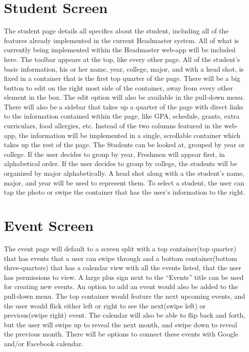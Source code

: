 \documentclass[12pt onesided letterpaper]{article}
\begin{document}
\section*{Student Screen}
The student page details all specifics about the student, including all of the features already implemented in the current Headmaster system.  All of what is currently being implemented within the Headmaster web-app will be included here.   The toolbar appears at the top, like every other page.  All of the student's basic information, his or her name, year, college, major, and with a head shot, is fixed in a container that is the first top quarter of the page.  There will be a big button to edit on the right most side of the container, away from every other element in the box.  The edit option will also be available in the pull-down menu.  There will also be a sidebar that takes up a quarter of the page with direct links to the information contained within the page, like GPA, schedule, grants, extra curriculars, food allergies, etc. Instead of the two columns featured in the web-app, the information will be implemented in a single, scrollable container which takes up the rest of the page.  
The Students can be looked at, grouped by year or college.  If the user decides to group by year, Freshmen will appear first, in alphabetical order.  If the user decides to group by college, the students will be organized by major alphabetically.  A head shot along with a the student's name, major, and year will be used to represent them. To select a student, the user can tap the photo or swipe the container that has the user's information to the right. 

\section*{Event Screen}
The event page will default to a screen split with a top container(top quarter) that has events that a user can swipe through and a bottom container(bottom three-quarters) that has a calendar view with all the events listed, that the user has permissions to view.  A large plus sign next to the “Events” title can be used for creating new events.  An option to add an event would also be added to the pull-down menu.  The top container would feature the next upcoming events, and the user would flick either left or right to see the next(swipe left) or previous(swipe right) event.  The calendar will also be able to flip back and forth, but the user will swipe up to reveal the next month, and swipe down to reveal the previous month. There will be options to connect these events with Google and/or Facebook calendar.
\end{document}
